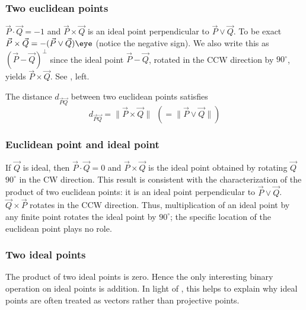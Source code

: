 \documentclass[12pt]{article}
\newcommand{\mydogblue}{{\color{gray} $\square$~~}}
\begin{document}
\subsubsection{Two euclidean points}   
\label{sec:twoeucpts}
$\vec{P} \cdot \vec{Q} = -1$ and $\vec{P} \times \vec{Q}$ is an ideal point perpendicular to $\vec{P} \vee \vec{Q}$. To be exact  $\vec{P} \times \vec{Q} = -(\vec{P} \vee \vec{Q})\eye$ (notice the negative sign). We also write this as $(\vec{P}-\vec{Q})^{\perp}$ since the ideal point $\vec{P} - \vec{Q}$, rotated in the CCW direction by $90^{\circ}$, yields $\vec{P}\times \vec{Q}$.   See , left. %
 
 \myexercise  The distance  $d_{\vec{P}\vec{Q}}$ between two euclidean points %
 satisfies \[d_{\vec{P}\vec{Q}} = \| \vec{P} \times \vec{Q} \| ~~(= \| \vec{P} \vee \vec{Q} \|)\]%


\subsubsection{Euclidean point and ideal point}  If $\vec{Q}$ is ideal, then $\vec{P} \cdot \vec{Q} = 0$ and $\vec{P} \times \vec{Q}$ is the ideal point obtained by rotating $\vec{Q}$ $90^{\circ}$ in the CW direction.  This result is consistent with the characterization of the product of two euclidean points: it is an ideal point perpendicular to $\vec{P} \vee \vec{Q}$. $\vec{Q} \times \vec{P}$ rotates in the CCW direction. Thus, multiplication of an ideal point by any finite point rotates the ideal point by $90^{\circ}$; the specific location of the euclidean point plays no role.  
  
\subsubsection{Two ideal points} The product of two ideal points is zero.  Hence the only interesting binary operation on ideal points is addition.  In light of , this helps to explain why ideal points are often treated as vectors rather than projective points.

\end{document}
